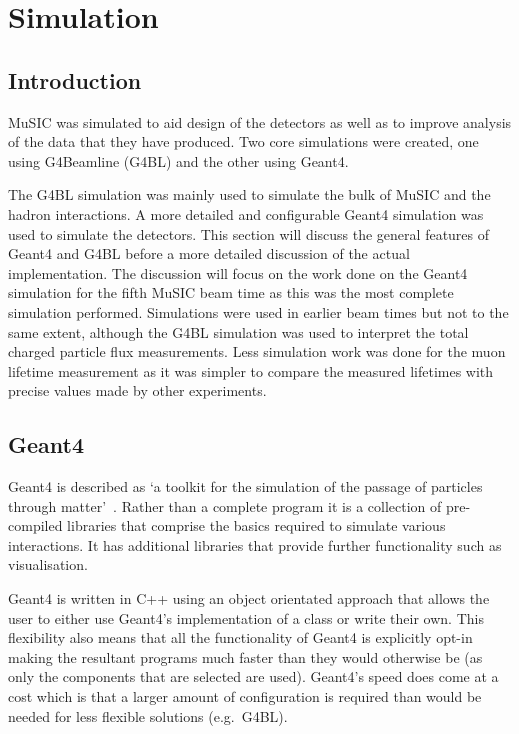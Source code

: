 \chapter{Simulation} %
\label{prt:simulation}
\section{Introduction} %
\label{cha:sim_introduction}
MuSIC was simulated to aid design of the detectors as well as to improve analysis of the data that they have produced. Two core simulations were created, one using G4Beamline (G4BL) and the other using Geant4. 

The G4BL simulation was mainly used to simulate the bulk of MuSIC and the hadron interactions. A more detailed and configurable Geant4 simulation was used to simulate the detectors. This section will discuss the general features of Geant4 and G4BL before a more detailed discussion of the actual implementation. The discussion will focus on the work done on the Geant4 simulation for the fifth MuSIC beam time as this was the most complete simulation performed. Simulations were used in earlier beam times but not to the same extent, although the G4BL simulation was used to interpret the total charged particle flux measurements. Less simulation work was done for the muon lifetime measurement as it was simpler to compare the measured lifetimes with precise values made by other experiments.

\section{Geant4} %
\label{sec:geant4}
Geant4 is described as `a toolkit for the simulation of the passage of particles through matter'~\cite{geant4}. Rather than a complete program it is a collection of pre-compiled libraries that comprise the basics required to simulate various interactions. It has additional libraries that provide further functionality such as visualisation. 

Geant4 is written in C++ using an object orientated approach that allows the user to either use Geant4's implementation of a class or write their own. This flexibility also means that all the functionality of Geant4 is explicitly opt-in making the resultant programs much faster than they would otherwise be (as only the components that are selected are used). Geant4's speed does come at a cost which is that a larger amount of configuration is required than would be needed for less flexible solutions (e.g.\ G4BL).

